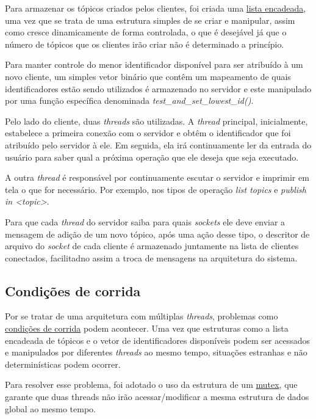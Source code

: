 \documentclass{article}
\begin{document}
Para armazenar os tópicos criados pelos clientes, foi criada uma
\href{https://en.wikipedia.org/wiki/Linked_list}{lista encadeada}, uma vez que
se trata de uma estrutura simples
de se criar e manipular, assim como cresce dinamicamente de forma controlada, o
que é desejável já que o número de tópicos que os clientes irão criar não é
determinado a princípio.

Para manter controle do menor identificador disponível para ser atribuído à um
novo cliente, um simples vetor binário que contêm um mapeamento de quais
identificadores estão sendo utilizados
é armazenado no servidor e este manipulado por uma função específica
denominada \textit{test\_and\_set\_lowest\_id()}.

Pelo lado do cliente, duas \textit{threads} são utilizadas. A \textit{thread}
principal, inicialmente, estabelece a primeira conexão com o servidor e obtêm o
identificador que foi atribuído pelo servidor à ele. Em seguida, ela irá
continuamente ler da entrada do usuário para saber qual a próxima operação que
ele deseja que seja executado.

A outra \textit{thread} é responsável por continuamente escutar o servidor e
imprimir em tela o que for necessário. Por exemplo, nos tipos de operação
\textit{list topics} e \textit{publish in <topic>}.

Para que cada \textit{thread} do servidor saiba para quais \textit{sockets} ele
deve enviar a mensagem de adição de um novo tópico, após uma ação desse tipo, o
descritor de arquivo do \textit{socket} de cada cliente é armazenado juntamente
na lista de clientes conectados, facilitadno assim a troca de mensagens na
arquitetura do sistema.

\subsection{Condições de corrida}

Por se tratar de uma arquitetura com múltiplas \textit{threads}, problemas
como
\href{https://learn.microsoft.com/en-us/troubleshoot/developer/visualstudio/visual-basic/language-compilers/race-conditions-deadlocks}{condições
      de corrida}
podem acontecer. Uma vez que estruturas como a lista encadeada de tópicos e o
vetor de identificadores disponíveis
podem ser acessados e manipulados por diferentes \textit{threads} ao mesmo
tempo, situações estranhas e não determinísticas podem ocorrer.

Para resolver esse problema, foi adotado o uso da estrutura de um
\href{https://www.ibm.com/docs/pt-br/aix/7.3?topic=programming-using-mutexes}{mutex},
que garante que duas threads não irão acessar/modificar a mesma estrutura de
dados global
ao mesmo tempo.
\end{document}
